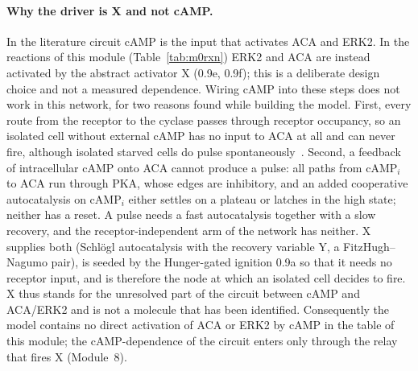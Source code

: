 \paragraph{Why the driver is X and not cAMP.}
In the literature circuit cAMP is the input that activates ACA and ERK2.
In the reactions of this module (Table~\ref{tab:m0rxn}) ERK2 and ACA are instead activated by the abstract activator X (0.9e, 0.9f); this is a deliberate design choice and not a measured dependence.
Wiring cAMP into these steps does not work in this network, for two reasons found while building the model.
First, every route from the receptor to the cyclase passes through receptor occupancy, so an isolated cell without external cAMP has no input to ACA at all and can never fire, although isolated starved cells do pulse spontaneously~\cite{ford2023}.
Second, a feedback of intracellular cAMP onto ACA cannot produce a pulse: all paths from cAMP$_i$ to ACA run through PKA, whose edges are inhibitory, and an added cooperative autocatalysis on cAMP$_i$ either settles on a plateau or latches in the high state; neither has a reset.
A pulse needs a fast autocatalysis together with a slow recovery, and the receptor-independent arm of the network has neither.
X supplies both (Schl\"ogl autocatalysis with the recovery variable Y, a FitzHugh--Nagumo pair), is seeded by the Hunger-gated ignition 0.9a so that it needs no receptor input, and is therefore the node at which an isolated cell decides to fire.
X thus stands for the unresolved part of the circuit between cAMP and ACA/ERK2 and is not a molecule that has been identified.
Consequently the model contains no direct activation of ACA or ERK2 by cAMP in the table of this module; the cAMP-dependence of the circuit enters only through the relay that fires X (Module~8).




